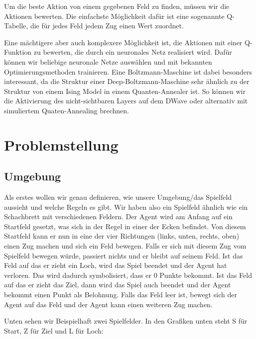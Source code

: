Um die beste Aktion von einem gegebenen Feld zu finden, müssen wir die Aktionen bewerten. Die einfachste Möglichkeit dafür ist eine sogenannte Q-Tabelle, die für jedes Feld jedem Zug einen Wert zuordnet.

Eine mächtigere aber auch komplexere Möglichkeit ist, die Aktionen mit einer Q-Funktion zu bewerten, die durch ein neuronales Netz realisiert wird. Dafür können wir beliebige neuronale Netze auswählen und mit bekannten Optimierungsmethoden trainieren. Eine Boltzmann-Maschine ist dabei besonders interessant, da die Struktur einer Deep-Boltzmann-Maschine sehr ähnlich zu der Struktur von einem Ising Model in einem Quanten-Annealer ist. So können wir die Aktivierung des nicht-sichtbaren Layers auf dem DWave oder alternativ mit simuliertem Quaten-Annealing brechnen.

\section{Problemstellung}
\label{sec:prob}

\subsection{Umgebung}
\label{subsec:umg}

Als erstes wollen wir genau definieren, wie unsere Umgebung/das Spielfeld aussieht und welche Regeln es gibt. Wir haben also ein Spielfeld ähnlich wie ein Schachbrett mit verschiedenen Feldern. Der Agent wird am Anfang auf ein Startfeld gesetzt, was sich in der Regel in einer der Ecken befindet. Von diesem Startfeld kann er nun in eine der vier Richtungen (links, unten, rechts, oben) einen Zug machen und sich ein Feld bewegen. Falls er sich mit diesem Zug vom Spielfeld bewegen würde, passiert nichts und er bleibt auf seinem Feld. Ist das Feld auf das er zieht ein Loch, wird das Spiel beendet und der Agent hat verloren. Das wird dadurch symbolisiert, dass er 0 Punkte bekommt. Ist das Feld auf das er zieht das Ziel, dann wird das Spiel auch beendet und der Agent bekommt einen Punkt als Belohnung. Falls das Feld leer ist, bewegt sich der Agent auf das Feld und der Agent kann einen weiteren Zug machen.

Unten sehen wir Beispielhaft zwei Spielfelder. In den Grafiken unten steht S für Start, Z für Ziel und L für Loch:

